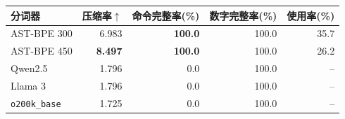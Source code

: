 \begin{tabular*}{\linewidth}{@{\extracolsep{\fill}}lrrrr@{}}\toprule
分词器 & 压缩率$\uparrow$ & 命令完整率(\%) & 数字完整率(\%) & 使用率(\%)\\\midrule
AST-BPE 300 & 6.983 & \textbf{100.0} & 100.0 & 35.7\\
AST-BPE 450 & \textbf{8.497} & \textbf{100.0} & 100.0 & 26.2\\
Qwen2.5 & 1.796 & 0.0 & 100.0 & --\\
Llama 3 & 1.796 & 0.0 & 100.0 & --\\
\texttt{o200k\_base} & 1.725 & 0.0 & 100.0 & --\\
\bottomrule\end{tabular*}